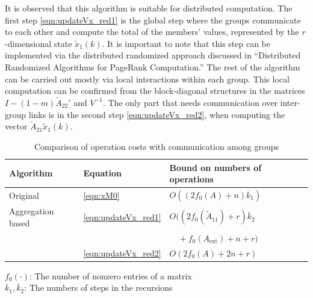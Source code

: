 \documentclass[11pt,draftcls,onecolumn]{IEEEtran}
\begin{document}
It is observed that this algorithm is suitable for distributed computation. 
The first step \eqref{eqn:updateVx_red1} is the global step
where the groups communicate to each other and
compute the total of the members' values, represented by 
the $r$-dimensional state $\widetilde{x}_1(k)$.
It is important to note that this step can be implemented via the 
distributed randomized approach discussed in 
``Distributed Randomized Algorithms for PageRank Computation.''
The rest of the algorithm can be carried out mostly  
via local interactions within each group.
This local computation can be confirmed from the block-diagonal structures in
the matrices $I - (1-m)\widetilde{A}_{22}'$ and $V^{-1}$.
The only part that needs communication over inter-group links
is in the second step \eqref{eqn:updateVx_red2}, when 
computing the vector $\widetilde{A}_{21} \widetilde{x}_1(k)$.



\begin{table}[t]
\begin{center}
\caption{Comparison of operation costs with communication among groups}
\label{table:operation}
\begin{tabular}{lll}
  \hline
   Algorithm & Equation & Bound on numbers of operations\\
  \hline%
  Original & \eqref{eqn:xM0} 
    & $O((2 f_{0}(A)+n)\overline{k}_1)$\\
  Aggregation based & \eqref{eqn:updateVx_red1}
    & $O((2f_{0}(\widetilde{A}_{11})+r)\overline{k}_2$\\
    & &  \hspace*{1.1cm}~~$\mbox{} + f_{0}(A_{\text{ext}}) + n + r)$\\
                    & \eqref{eqn:updateVx_red2}
    & $O(2 f_{0}(A)+2n+r)$\\
  \hline
\end{tabular}
\end{center}
\hspace*{6cm} 
$f_0(\cdot)$: The number of nonzero entries of a matrix\\[.5mm]
\hspace*{6cm} 
$\overline{k}_1,\overline{k}_2$: The numbers of steps in the recursions
\end{table}
\end{document}
